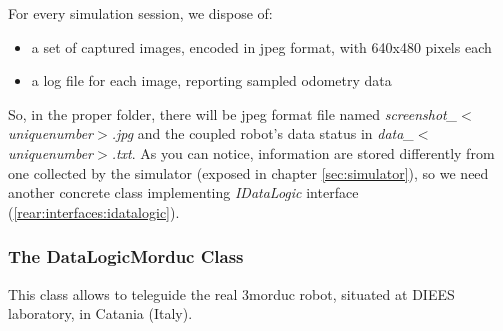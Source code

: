 For every simulation session, we dispose of:

\begin{itemize}
  \item a set of captured images, encoded in jpeg format,
    with 640x480 pixels each
  \item a log file for each image, reporting sampled odometry data
\end{itemize}

So, in the proper folder, there will be jpeg format file named
\textit{screenshot\_$<$uniquenumber$>$.jpg} and the coupled robot's
data status in \textit{data\_$<$uniquenumber$>$.txt}. As you can notice,
information are stored differently from one collected by the simulator
(exposed in chapter \ref{sec:simulator}), so we need another concrete
class implementing \textit{IDataLogic} interface
(\ref{rear:interfaces:idatalogic}).


\subsubsection{The DataLogicMorduc Class}
\label{concr:idatalogic:datalogicmorduc}

This class allows \framework{} to teleguide the real 3morduc
robot, situated at DIEES laboratory, in Catania (Italy).
